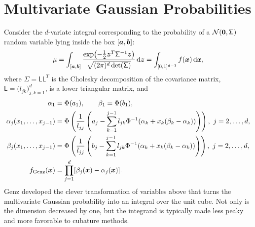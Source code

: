 \documentclass[graybox,footinfo]{svmult}
\begin{document}
\section{Multivariate Gaussian Probabilities} \label{FJH:sec:Gauss}
Consider the $d$-variate integral corresponding to the probability of a 
${\mathcal{N}}({\boldsymbol{0}},\mathsf{\Sigma})$ random variable lying inside the box $[{\boldsymbol{a}},{\boldsymbol{b}}]$:
\begin{equation} \label{FJH:eq:MVN}
\mu = \int_{[\bsa,\bsb]} \frac{\exp\bigl(- \frac 12 \bsz^T \mathsf{\Sigma}^{-1} \bsz 
\bigr)}{\sqrt{(2 \pi)^d \det(\mathsf{\Sigma})}} \, \D \bsz = \int_{[0,1]^{d-1}} f(\bsx) \, \D 
\bsx,
\end{equation}
where $\mathsf{\Sigma} = \mathsf{L}\mathsf{L}^T$ is the Cholesky decomposition of 
the covariance matrix, $\mathsf{L} = \bigl(l_{jk}\bigr)_{j,k=1}^d$, is a lower triangular 
matrix, and
\begin{align}
\nonumber
\alpha_1 & = \Phi(a_1), \qquad \beta_1  = \Phi(b_1), \\
\nonumber
\alpha_j(x_1, \ldots, x_{j-1}) &= \Phi\left(\frac{1}{l_{jj}} \left(a_j - \sum_{k=1}^{j-1} 
l_{jk}\Phi^{-1}(\alpha_k + x_k(\beta_k-\alpha_k))\right)\right), \ j =2, \ldots, d,\\
\nonumber
\beta_j(x_1, \ldots, x_{j-1}) &= \Phi\left(\frac{1}{l_{jj}} \left(b_j - \sum_{k=1}^{j-1} 
l_{jk}\Phi^{-1}(\alpha_k + x_k(\beta_k-\alpha_k))\right)\right), \ j =2, \ldots, d, \\
f_{\textup{Genz}}(\bsx) &= \prod_{j=1}^{d} [\beta_j(\bsx) - \alpha_j(\bsx)]. 
\label{FJH:eq:Genz}
\end{align}
Genz \cite{Gen93} developed the clever transformation of variables above that turns the 
multivariate Gaussian probability into an integral over the unit cube.  Not only is the 
dimension decreased by one, but the integrand is typically made less peaky and more 
favorable to cubature methods.
\end{document}

